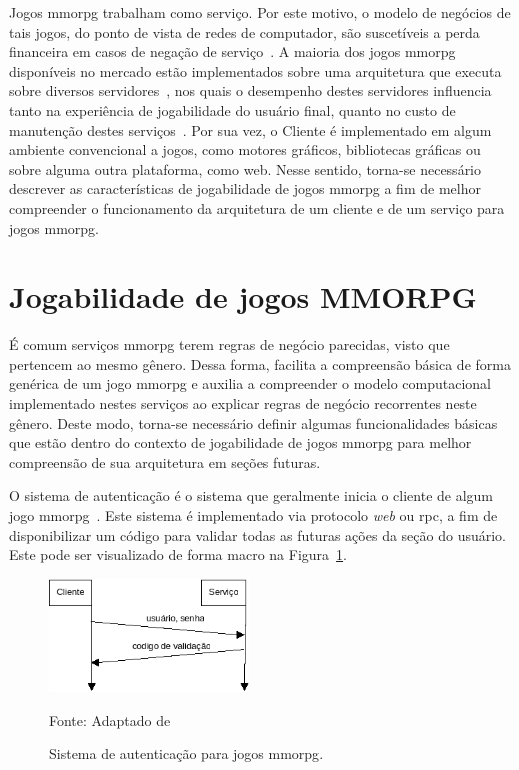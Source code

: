 Jogos \ac{mmorpg} trabalham como serviço.
%
Por este motivo, o modelo de negócios de tais jogos, do ponto de vista de redes de computador, são suscetíveis a perda financeira em casos de negação de serviço~\cite{1417630}.
%
A maioria dos jogos \ac{mmorpg} disponíveis no mercado estão implementados sobre uma arquitetura que executa sobre diversos servidores~\cite{stephenclarkewillson2017}, nos quais o desempenho destes servidores influencia tanto na experiência de jogabilidade do usuário final, quanto no custo de manutenção destes serviços~\cite{1417630}.
%
Por sua vez, o Cliente é implementado em algum ambiente convencional a jogos, como motores gráficos, bibliotecas gráficas ou sobre alguma outra plataforma, como web.
%
Nesse sentido, torna-se necessário descrever as características de jogabilidade de jogos \ac{mmorpg} a fim de melhor compreender o funcionamento da arquitetura de um cliente e de um serviço para jogos \ac{mmorpg}.



\section{Jogabilidade de jogos MMORPG}
\label{sec:jogabilidade}



É comum serviços \ac{mmorpg} terem regras de negócio parecidas, visto que pertencem ao mesmo gênero.
%
Dessa forma, facilita a compreensão básica de forma genérica de um jogo \ac{mmorpg} e auxilia a compreender o modelo computacional implementado nestes serviços ao explicar regras de negócio recorrentes neste gênero.
%
Deste modo, torna-se necessário definir algumas funcionalidades básicas que estão dentro do contexto de jogabilidade de jogos \ac{mmorpg} para melhor compreensão de sua arquitetura em seções futuras.


O sistema de autenticação é o sistema que geralmente inicia o cliente de algum jogo \ac{mmorpg}~\cite{albion_online_unite, matthiasrudy2011}.
%
Este sistema é implementado via protocolo \textit{web} ou \ac{rpc}, a fim de disponibilizar um código para validar todas as futuras ações da seção do usuário.
%
Este pode ser visualizado de forma macro na Figura~\ref{fig:autenticacao}.

\begin{figure}[htb!]
\caption{Sistema de autenticação para jogos \ac{mmorpg}.}
\label{fig:autenticacao}
\includegraphics[height=3cm]{img/cap2/autenticacao.png}
\centering

Fonte: Adaptado de ~\cite{LeckyThompson2008Nov}
\end{figure}


